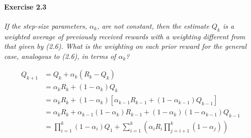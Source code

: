 \paragraph{Exercise 2.3}
\textit{If the step-size parameters, $\alpha_k$, are not constant, then the estimate $Q_k$ is a weighted average of previously received rewards with a weighting different from that given by (2.6). What is the weighting on each prior reward for the general case, analogous to (2.6), in terms of $\alpha_k$?}

\begin{align*}
Q_{k+1} &= Q_k + \alpha_k (R_k - Q_k) \\
        &= \alpha_k R_k + (1 - \alpha_k) Q_k \\
        &= \alpha_k R_k + (1 - \alpha_k) [\alpha_{k-1} R_{k-1} + (1 - \alpha_{k-1}) Q_{k-1}] \\
        &= \alpha_k R_k + \alpha_{k-1} (1 - \alpha_k) R_{k-1} + (1 - \alpha_{k}) (1 - \alpha_{k-1}) Q_{k-1} \\
        &= \prod_{i=1}^k (1 - \alpha_i) Q_1 + \sum_{i=1}^k \left( \alpha_i R_i \prod_{j=i+1}^{k} (1 - \alpha_j)  \right) \\
\end{align*}

